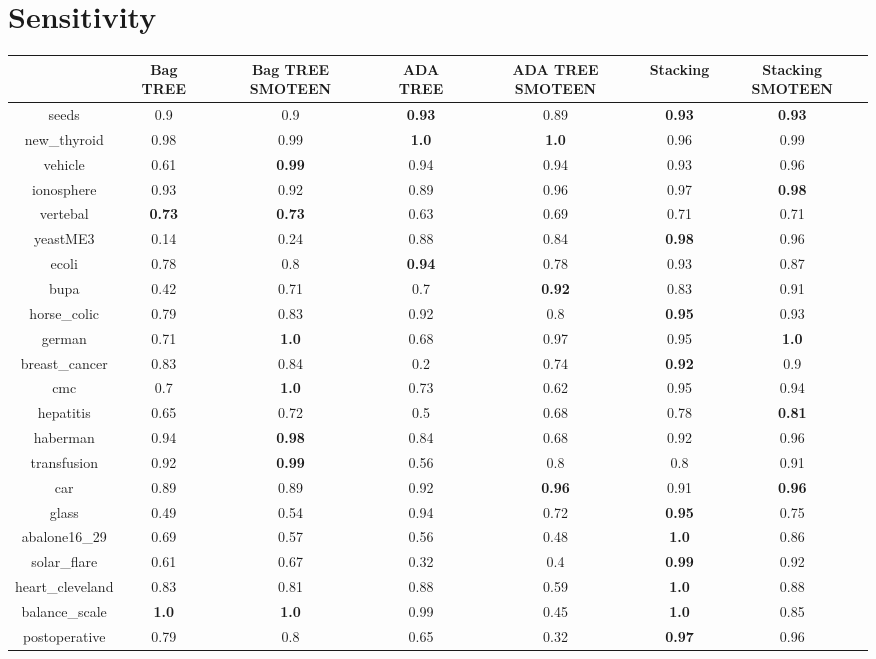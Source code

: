 \documentclass{article}%
\begin{document}
\section*{Sensitivity}%
\begin{tabular}{c|cccccc}%
&Bag TREE&Bag TREE SMOTEEN&ADA TREE&ADA TREE SMOTEEN&Stacking&Stacking SMOTEEN\\%
\hline%
seeds&0.9&0.9&\textbf{0.93}&0.89&\textbf{0.93}&\textbf{0.93}\\%
new\_thyroid&0.98&0.99&\textbf{1.0}&\textbf{1.0}&0.96&0.99\\%
vehicle&0.61&\textbf{0.99}&0.94&0.94&0.93&0.96\\%
ionosphere&0.93&0.92&0.89&0.96&0.97&\textbf{0.98}\\%
vertebal&\textbf{0.73}&\textbf{0.73}&0.63&0.69&0.71&0.71\\%
yeastME3&0.14&0.24&0.88&0.84&\textbf{0.98}&0.96\\%
ecoli&0.78&0.8&\textbf{0.94}&0.78&0.93&0.87\\%
bupa&0.42&0.71&0.7&\textbf{0.92}&0.83&0.91\\%
horse\_colic&0.79&0.83&0.92&0.8&\textbf{0.95}&0.93\\%
german&0.71&\textbf{1.0}&0.68&0.97&0.95&\textbf{1.0}\\%
breast\_cancer&0.83&0.84&0.2&0.74&\textbf{0.92}&0.9\\%
cmc&0.7&\textbf{1.0}&0.73&0.62&0.95&0.94\\%
hepatitis&0.65&0.72&0.5&0.68&0.78&\textbf{0.81}\\%
haberman&0.94&\textbf{0.98}&0.84&0.68&0.92&0.96\\%
transfusion&0.92&\textbf{0.99}&0.56&0.8&0.8&0.91\\%
car&0.89&0.89&0.92&\textbf{0.96}&0.91&\textbf{0.96}\\%
glass&0.49&0.54&0.94&0.72&\textbf{0.95}&0.75\\%
abalone16\_29&0.69&0.57&0.56&0.48&\textbf{1.0}&0.86\\%
solar\_flare&0.61&0.67&0.32&0.4&\textbf{0.99}&0.92\\%
heart\_cleveland&0.83&0.81&0.88&0.59&\textbf{1.0}&0.88\\%
balance\_scale&\textbf{1.0}&\textbf{1.0}&0.99&0.45&\textbf{1.0}&0.85\\%
postoperative&0.79&0.8&0.65&0.32&\textbf{0.97}&0.96\\%
\end{tabular}

%
\end{document}
